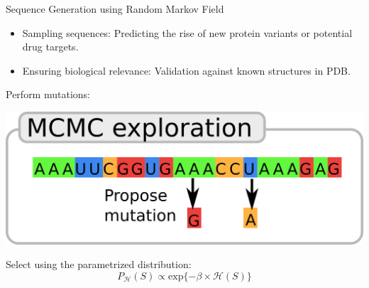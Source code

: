 \documentclass[presentation,smaller]{beamer}
\begin{document}
\begin{frame}[label={sec:org60d63a4}]{Sequence Generation using Random Markov Field}
\begin{itemize}
\item Sampling sequences: Predicting the rise of new protein variants or potential drug targets.
\item Ensuring biological relevance: Validation against known structures in PDB.
\end{itemize}

Perform mutations:
\begin{center}
\begin{center}
\includegraphics[scale=0.3]{./img/mcmc_seq.png}
\end{center}
\end{center}

Select using the parametrized distribution:
\begin{equation*}
P_{\mathcal{H}}(S) \propto \text{exp}\{-\beta \times \mathcal{H}(S)\}
\end{equation*}
\end{frame}
\end{document}
